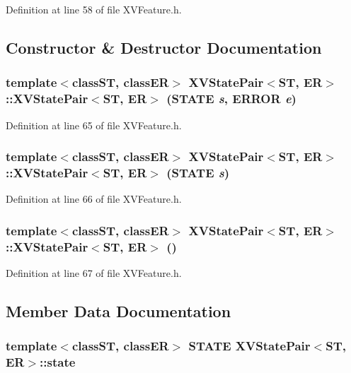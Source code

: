 Definition at line 58 of file XVFeature.h.

\subsection{Constructor \& Destructor Documentation}
\label{XVStatePair_a0}
\hypertarget{class_XVStatePair_a0}{
\subsubsection[XVStatePair]{\setlength{\rightskip}{0pt plus 5cm}template$<$classST, classER$>$ XVState\-Pair$<$ST, ER$>$::XVState\-Pair$<$ST, ER$>$ (STATE {\em s}, ERROR {\em e})}}




Definition at line 65 of file XVFeature.h.\label{XVStatePair_a1}
\hypertarget{class_XVStatePair_a1}{
\subsubsection[XVStatePair]{\setlength{\rightskip}{0pt plus 5cm}template$<$classST, classER$>$ XVState\-Pair$<$ST, ER$>$::XVState\-Pair$<$ST, ER$>$ (STATE {\em s})}}




Definition at line 66 of file XVFeature.h.\label{XVStatePair_a2}
\hypertarget{class_XVStatePair_a2}{
\subsubsection[XVStatePair]{\setlength{\rightskip}{0pt plus 5cm}template$<$classST, classER$>$ XVState\-Pair$<$ST, ER$>$::XVState\-Pair$<$ST, ER$>$ ()}}




Definition at line 67 of file XVFeature.h.

\subsection{Member Data Documentation}
\label{XVStatePair_m0}
\hypertarget{class_XVStatePair_m0}{
\subsubsection[state]{\setlength{\rightskip}{0pt plus 5cm}template$<$classST, classER$>$ STATE XVState\-Pair$<$ST, ER$>$::state}}




